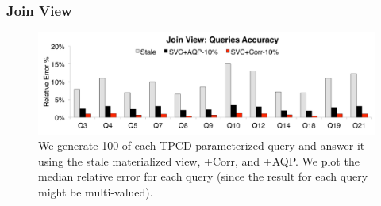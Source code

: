 \subsubsection{Join View}



\begin{figure}[t]\vspace{-2em}
\centering
\includegraphics[scale=0.13]{exp/msj_3.pdf}\vspace{-.5em}
 \caption{We generate 100 of each TPCD parameterized query and answer it using the stale materialized view, \svcnospace+Corr, and \svcnospace+AQP. We plot the median relative error for each query (since the result for each query might be multi-valued).\label{exp-1-acc}}
\end{figure}

